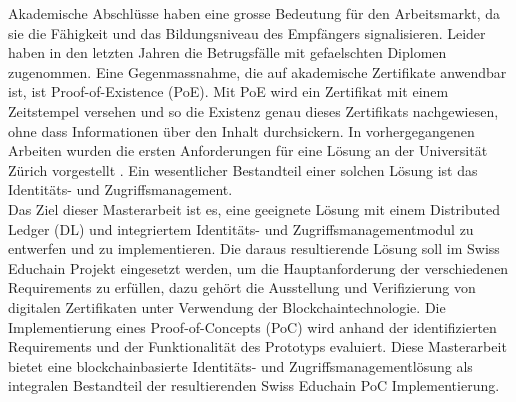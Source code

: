 Akademische Abschl{\"u}sse haben eine grosse Bedeutung f{\"u}r den Arbeitsmarkt, da sie die F{\"a}higkeit und das Bildungsniveau des Empf{\"a}ngers signalisieren. Leider haben in den letzten Jahren die Betrugsf{\"a}lle mit gefaelschten Diplomen zugenommen. Eine Gegenmassnahme, die auf akademische Zertifikate anwendbar ist, ist Proof-of-Existence (PoE). Mit PoE wird ein Zertifikat mit einem Zeitstempel versehen und so die Existenz genau dieses Zertifikats nachgewiesen, ohne dass Informationen {\"u}ber den Inhalt durchsickern. In vorhergegangenen Arbeiten wurden die ersten Anforderungen f{\"u}r eine L{\"o}sung an der Universit{\"a}t Z{\"u}rich vorgestellt \cite{educhain-architecture}. Ein wesentlicher Bestandteil einer solchen L{\"o}sung ist das Identit{\"a}ts- und Zugriffsmanagement. \\
Das Ziel dieser Masterarbeit ist es, eine geeignete L{\"o}sung mit einem Distributed Ledger (DL) und integriertem Identit{\"a}ts- und Zugriffsmanagementmodul zu entwerfen und zu implementieren. Die daraus resultierende L{\"o}sung soll im Swiss Educhain Projekt \cite{educhain-proposal} eingesetzt werden, um die Hauptanforderung der verschiedenen Requirements zu erf{\"u}llen, dazu geh{\"o}rt die Ausstellung und Verifizierung von digitalen Zertifikaten unter Verwendung der Blockchaintechnologie. Die Implementierung eines Proof-of-Concepts (PoC) wird anhand der identifizierten Requirements und der Funktionalit{\"a}t des Prototyps evaluiert. Diese Masterarbeit bietet eine blockchainbasierte Identit{\"a}ts- und Zugriffsmanagementl{\"o}sung als integralen Bestandteil der resultierenden Swiss Educhain PoC Implementierung.



